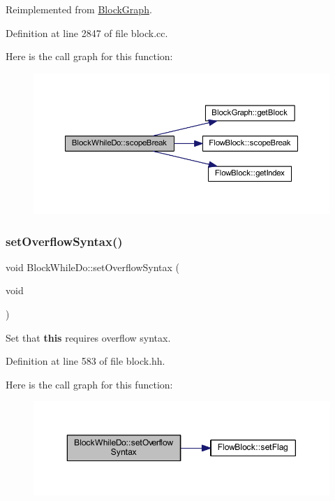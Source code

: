 Reimplemented from \mbox{\hyperlink{class_block_graph_a55618dfd49266bd4185d119f08e8b630}{Block\+Graph}}.



Definition at line 2847 of file block.\+cc.

Here is the call graph for this function\+:
\nopagebreak
\begin{figure}[H]
\begin{center}
\leavevmode
\includegraphics[width=350pt]{class_block_while_do_a87ab7a000da06ffdca299db53495eae0_cgraph}
\end{center}
\end{figure}
\mbox{\label{class_block_while_do_a29dda35c88940834f2af760dbeb0512d}} 
\subsubsection{\texorpdfstring{setOverflowSyntax()}{setOverflowSyntax()}}
{\footnotesize\ttfamily void Block\+While\+Do\+::set\+Overflow\+Syntax (\begin{DoxyParamCaption}\item[{void}]{ }\end{DoxyParamCaption})\hspace{0.3cm}{\ttfamily [inline]}}



Set that {\bfseries{this}} requires overflow syntax. 



Definition at line 583 of file block.\+hh.

Here is the call graph for this function\+:
\nopagebreak
\begin{figure}[H]
\begin{center}
\leavevmode
\includegraphics[width=350pt]{class_block_while_do_a29dda35c88940834f2af760dbeb0512d_cgraph}
\end{center}
\end{figure}


